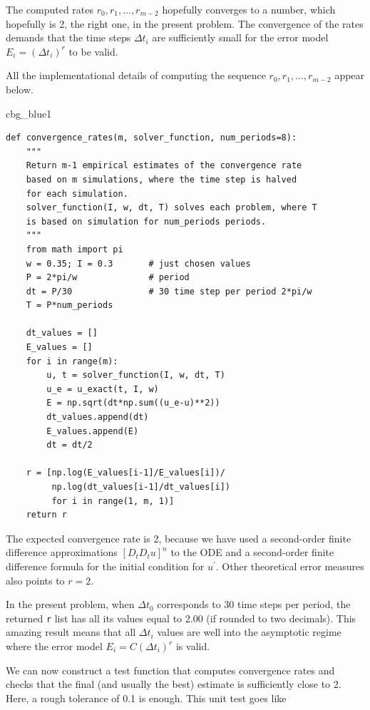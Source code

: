 \documentclass[%
oneside,                 %
final,                   %
10pt]{article}
\newenvironment{_cod_tight}[1]{
   \def\FrameCommand{\colorbox{#1}}
   \FrameRule0.6pt\MakeFramed {\FrameRestore}\vskip3mm}
   {\vskip0mm\endMakeFramed}
\newenvironment{cod}[1]{
\bgroup\rmfamily
\fboxsep=0mm\relax
\begin{_cod_tight}{#1}
\list{}{\parsep=-2mm\parskip=0mm\topsep=0pt\leftmargin=2mm
\rightmargin=2\leftmargin\leftmargin=4pt\relax}
\item\relax}
{\endlist\end{_cod_tight}\egroup}
\begin{document}
\noindent
The computed rates $r_0,r_1,\ldots,r_{m-2}$ hopefully converges to a
number, which hopefully is 2, the right one, in the present
problem. The convergence of the rates demands that the time steps
$\Delta t_i$ are sufficiently small for the error model $E_i=(\Delta t_i)^r$
to be valid.

All the implementational details of computing the sequence
$r_0,r_1,\ldots,r_{m-2}$ appear below.

\begin{cod}{cbg_blue1}\begin{Verbatim}[numbers=none,fontsize=\fontsize{9pt}{9pt},baselinestretch=0.95,xleftmargin=2mm]
def convergence_rates(m, solver_function, num_periods=8):
    """
    Return m-1 empirical estimates of the convergence rate
    based on m simulations, where the time step is halved
    for each simulation.
    solver_function(I, w, dt, T) solves each problem, where T
    is based on simulation for num_periods periods.
    """
    from math import pi
    w = 0.35; I = 0.3       # just chosen values
    P = 2*pi/w              # period
    dt = P/30               # 30 time step per period 2*pi/w
    T = P*num_periods

    dt_values = []
    E_values = []
    for i in range(m):
        u, t = solver_function(I, w, dt, T)
        u_e = u_exact(t, I, w)
        E = np.sqrt(dt*np.sum((u_e-u)**2))
        dt_values.append(dt)
        E_values.append(E)
        dt = dt/2

    r = [np.log(E_values[i-1]/E_values[i])/
         np.log(dt_values[i-1]/dt_values[i])
         for i in range(1, m, 1)]
    return r
\end{Verbatim}
\end{cod}
\noindent
The expected convergence rate is 2, because we have used
a second-order finite
difference approximations $[D_tD_tu]^n$ to the ODE and a
second-order finite difference formula for the initial condition for
$u^{\prime}$. Other theoretical error measures also points to
$r=2$.

In the present problem, when $\Delta t_0$ corresponds to 30 time steps
per period, the returned \texttt{r} list has all its values equal to 2.00
(if rounded to two decimals). This amazing result means that all
$\Delta t_i$ values are well into the asymptotic regime where the
error model $E_i = C(\Delta t_i)^r$ is valid.

We can now construct a test function that computes convergence rates
and checks that the final (and usually the best) estimate is sufficiently
close to 2. Here, a rough tolerance of 0.1 is enough. This unit test
goes like
\end{document}
